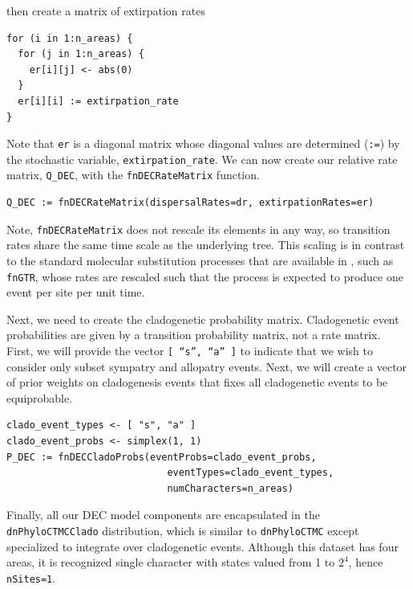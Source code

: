 then create a matrix of extirpation rates

\begin{snugshade}
\begin{lstlisting}
for (i in 1:n_areas) {
  for (j in 1:n_areas) {
    er[i][j] <- abs(0)        
  }
  er[i][i] := extirpation_rate
}
\end{lstlisting}
\end{snugshade}

Note that {\tt er} is a diagonal matrix whose diagonal values are determined ({\tt :=}) by the stochastic variable, {\tt extirpation\_rate}.
We can now create our relative rate matrix, {\tt Q\_DEC}, with the {\tt fnDECRateMatrix} function.

\begin{snugshade}
\begin{lstlisting}
Q_DEC := fnDECRateMatrix(dispersalRates=dr, extirpationRates=er)
\end{lstlisting}
\end{snugshade}

Note, {\tt fnDECRateMatrix} does not rescale its elements in any way, so transition rates share the same time scale as the underlying tree.
This scaling is in contrast to the standard molecular substitution processes that are available in \RevBayes, such as {\tt fnGTR}, whose rates are rescaled such that the process is expected to produce one event per site per unit time.

Next, we need to create the cladogenetic probability matrix.
Cladogenetic event probabilities are given by a transition probability matrix, not a rate matrix.
First, we will provide the vector {\tt [ ``s'', ``a'' ]} to indicate that we wish to consider only subset sympatry and allopatry events.
Next, we will create a vector of prior weights on cladogenesis events that fixes all cladogenetic events to be equiprobable.

\begin{snugshade}
\begin{lstlisting}
clado_event_types <- [ "s", "a" ]
clado_event_probs <- simplex(1, 1)
P_DEC := fnDECCladoProbs(eventProbs=clado_event_probs,
                            eventTypes=clado_event_types,
                            numCharacters=n_areas)
\end{lstlisting}
\end{snugshade}

Finally, all our DEC model components are encapsulated in the {\tt dnPhyloCTMCClado} distribution, which is similar to {\tt dnPhyloCTMC} except specialized to integrate over cladogenetic events.
Although this dataset has four areas, it is recognized single character with states valued from 1 to $2^4$, hence {\tt nSites=1}.

